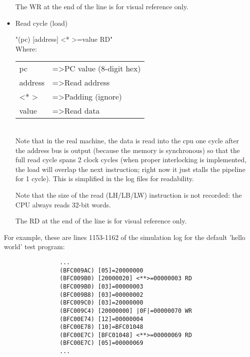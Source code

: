 \begin{itemize}
        The WR at the end of the line is for visual reference only.

    \item Read cycle (load)

        "(pc) [address] \textless ** \textgreater =value RD"\\

        Where:
        
        \begin{tabular}{ l l }
        pc      & =\textgreater PC value (8-digit hex)\\
        address & =\textgreater Read address\\
        \textless ** \textgreater    & =\textgreater Padding (ignore)\\
        value   & =\textgreater Read data\\
        \end{tabular}\\

        Note that in the real machine, the data is read into the cpu one cycle
        after the address bus is output (because the memory is synchronous) so
        that the full read cycle spans 2 clock cycles (when proper interlocking
        is implemented, the load will overlap the next instruction; right now
        it just stalls the pipeline for 1 cycle). This is simplified in the log
        files for readability.

        Note that the size of the read (LH/LB/LW) instruction is not recorded:
        the CPU always reads 32-bit words.

        The RD at the end of the line is for visual reference only.

    \end{itemize}
       

    For example, these are lines 1153-1162 of the simulation log for the
    default 'hello world' test program:

                \begin{verbatim}
                ...
                (BFC009AC) [05]=20000000
                (BFC009B0) [20000020] <**>=00000003 RD
                (BFC009B0) [03]=00000003
                (BFC009B8) [03]=00000002
                (BFC009C0) [03]=20000000
                (BFC009C4) [20000000] |0F|=00000070 WR
                (BFC00E74) [12]=00000004
                (BFC00E78) [10]=BFC01048
                (BFC00E7C) [BFC01048] <**>=00000069 RD
                (BFC00E7C) [05]=00000069
                ...
                \end{verbatim}\\

